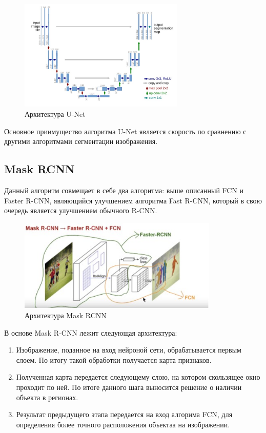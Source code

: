 \documentclass[bachelor, och, coursework]{shiza}
\begin{document}
\begin{figure}[H]
    \centering
    \includegraphics[width=0.7\textwidth]{8}
    \caption{Архитектура U-Net}
    \label{fig:img1}
\end{figure}

Основное приимущество алгоритма U-Net является скорость по сравнению с другими алгоритмами сегментации изображения.

\subsection{Mask RCNN}

Данный алгоритм совмещает в себе два алгоритма: выше описанный FCN и Faster R-CNN, являющийся улучшением алгоритма Fast R-CNN, который в свою очередь 
является улучшением обычного R-CNN. 

\begin{figure}[H]
    \centering
    \includegraphics[width=0.85\textwidth]{10}
    \caption{Архитектура Mask RCNN}
    \label{fig:img1}
\end{figure}

В основе Mask R-CNN лежит следующая архитектура:

\begin{enumerate}
    \item Изображение, поданное на вход нейроной сети, обрабатывается первым слоем. По итогу такой обработки получается карта признаков.
    \item Полученная карта передается следующему слою, на котором скользящее окно проходит по ней. По итоге данного шага выносится решение о наличии
    объекта в регионах.
    \item Результат предыдущего этапа передается на вход алгорима FCN, для определения более точного расположения объектаа на изображении.
\end{enumerate}
\end{document}
